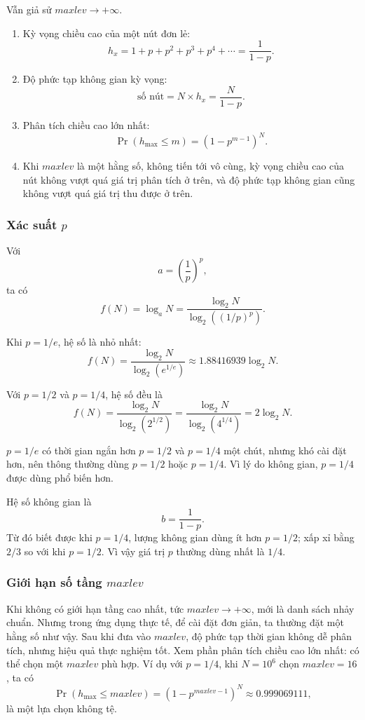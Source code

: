 \documentclass[11pt]{article}
\newcommand{\maxlev}{\mathit{maxlev}}
\begin{document}
Vẫn giả sử $\maxlev\to+\infty$.

\begin{enumerate}
  \item Kỳ vọng chiều cao của một nút đơn lẻ:
  \[
    h_x=1+p+p^2+p^3+p^4+\cdots=\frac{1}{1-p}.
  \]

  \item Độ phức tạp không gian kỳ vọng:
  \[
    \text{số nút}=N\times h_x=\frac{N}{1-p}.
  \]

  \item Phân tích chiều cao lớn nhất:
  \[
    \Pr(h_{\max}\le m)=\left(1-p^{m-1}\right)^N.
  \]

  \item Khi $\maxlev$ là một hằng số, không tiến tới vô cùng, kỳ vọng chiều
  cao của nút không vượt quá giá trị phân tích ở trên, và độ phức tạp không
  gian cũng không vượt quá giá trị thu được ở trên.
\end{enumerate}

\subsubsection*{Xác suất $p$}

Với
\[
  a=\left(\frac{1}{p}\right)^p,
\]
ta có
\[
  f(N)=\log_a N
      =\frac{\log_2 N}{\log_2\left((1/p)^p\right)}.
\]

Khi $p=1/e$, hệ số là nhỏ nhất:
\[
  f(N)
  =\frac{\log_2 N}{\log_2(e^{1/e})}
  \approx 1.88416939\log_2 N.
\]

Với $p=1/2$ và $p=1/4$, hệ số đều là
\[
  f(N)
  =\frac{\log_2 N}{\log_2(2^{1/2})}
  =\frac{\log_2 N}{\log_2(4^{1/4})}
  =2\log_2 N.
\]

$p=1/e$ có thời gian ngắn hơn $p=1/2$ và $p=1/4$ một chút, nhưng khó cài đặt
hơn, nên thông thường dùng $p=1/2$ hoặc $p=1/4$. Vì lý do không gian, $p=1/4$
được dùng phổ biến hơn.

Hệ số không gian là
\[
  b=\frac{1}{1-p}.
\]
Từ đó biết được khi $p=1/4$, lượng không gian dùng ít hơn $p=1/2$; xấp xỉ
bằng $2/3$ so với khi $p=1/2$. Vì vậy giá trị $p$ thường dùng nhất là $1/4$.

\subsubsection*{Giới hạn số tầng $\maxlev$}

Khi không có giới hạn tầng cao nhất, tức $\maxlev\to+\infty$, mới là danh sách
nhảy chuẩn. Nhưng trong ứng dụng thực tế, để cài đặt đơn giản, ta thường đặt
một hằng số như vậy. Sau khi đưa vào $\maxlev$, độ phức tạp thời gian không dễ
phân tích, nhưng hiệu quả thực nghiệm tốt. Xem phần phân tích chiều cao lớn
nhất: có thể chọn một $\maxlev$ phù hợp. Ví dụ với $p=1/4$, khi $N=10^6$ chọn
$\maxlev=16$, ta có
\[
  \Pr(h_{\max}\le \maxlev)
  =\left(1-p^{\maxlev-1}\right)^N
  \approx 0.999069111,
\]
là một lựa chọn không tệ.
\end{document}
